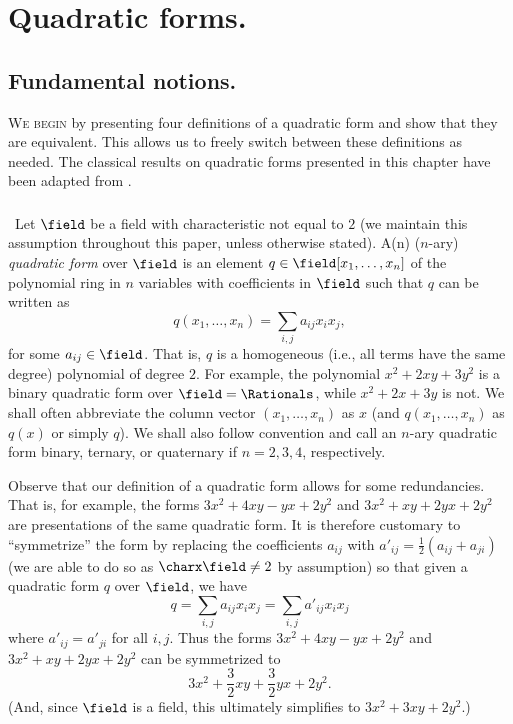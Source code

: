 \chapter{Quadratic forms.}
\label{chap:quadratic-forms}

\section{Fundamental notions.}

{\scshape We begin} by presenting four definitions of a quadratic form and show that they are equivalent. This allows us to freely switch between these definitions as needed. The classical results on quadratic forms presented in this chapter have been adapted from \cite{clarkquadratic,lam1973quadratic,ormsbynotes,szymiczek2017bilinear}.

\subsection{}\label{sec:quadratic-forms}~Let \(\field\) be a field with characteristic not equal to \(2\) (we maintain this assumption throughout this paper, unless otherwise stated). A(n) (\(n\)-ary) \emph{quadratic form} over \(\field\) is an element \(q \in \field[x_1, \dots, x_n]\) of the polynomial ring in \(n\) variables with coefficients in \(\field\) such that \(q\) can be written as
\[
  q(x_1, \dots, x_n) = \sum_{i, j} a_{ij}x_ix_j,
\]
for some \(a_{ij} \in \field\). That is, \(q\) is a homogeneous (i.e., all terms have the same degree) polynomial of degree \(2\). For example, the polynomial \(x^2 + 2xy + 3y^2\) is a binary quadratic form over \(\field = \Rationals\), while \(x^2 + 2x + 3y\) is not. We shall often abbreviate the column vector \((x_1, \dots, x_n)\) as \(x\) (and \(q(x_1, \dots, x_n)\) as \(q(x)\) or simply \(q\)). We shall also follow convention and call an \(n\)-ary quadratic form binary, ternary, or quaternary if \(n = 2, 3, 4\), respectively.

Observe that our definition of a quadratic form allows for some redundancies. That is, for example, the forms \(3x^2 + 4xy - yx + 2y^2\) and \(3x^2 + xy + 2yx + 2y^2\) are presentations of the same quadratic form. It is therefore customary  to ``symmetrize'' the form \cite{lam1973quadratic} by replacing the coefficients \(a_{ij}\) with \(a'_{ij} = \frac{1}{2}(a_{ij} + a_{ji})\) (we are able to do so as \(\charx \field \neq 2\) by assumption) so that given a quadratic form \(q\) over \(\field\), we have
\[
  q = \sum_{i, j} a_{ij} x_i x_j = \sum_{i, j} a'_{ij} x_i x_j
\]
where \(a'_{ij} = a'_{ji}\) for all \(i, j\). Thus the forms \(3x^2 + 4xy - yx + 2y^2\) and \(3x^2 + xy + 2yx + 2y^2\) can be symmetrized to \[3x^2 +\frac{3}{2}xy + \frac{3}{2}yx + 2y^2.\] (And, since \(\field\) is a field, this ultimately simplifies to \(3x^2 + 3xy + 2y^2\).)

